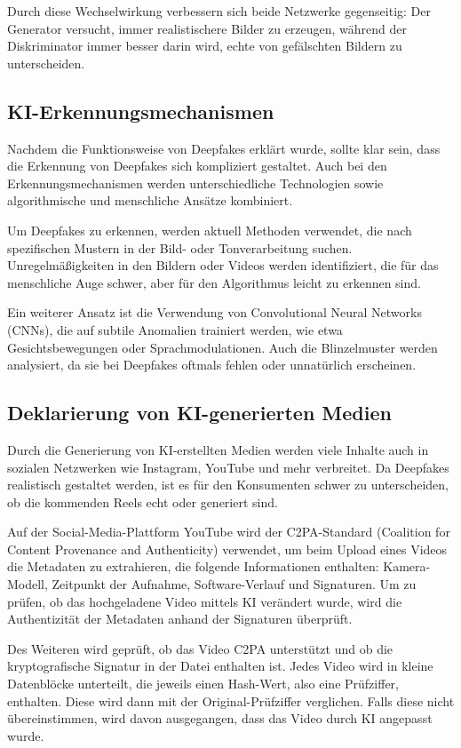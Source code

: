 \documentclass[a4paper,12pt]{article}
\begin{document}
Durch diese Wechselwirkung verbessern sich beide Netzwerke gegenseitig: Der Generator versucht, immer realistischere Bilder zu erzeugen, 
während der Diskriminator immer besser darin wird, echte von gefälschten Bildern zu unterscheiden. \cite{BVDW2024}

\subsection{KI-Erkennungsmechanismen}\label{subsec:KI-Erkennungsmechanismen}
Nachdem die Funktionsweise von Deepfakes erklärt wurde, sollte klar sein, dass die Erkennung von Deepfakes sich kompliziert gestaltet. 
Auch bei den Erkennungsmechanismen werden unterschiedliche Technologien sowie algorithmische und menschliche Ansätze kombiniert.  

Um Deepfakes zu erkennen, werden aktuell Methoden verwendet, die nach spezifischen Mustern in der Bild- oder Tonverarbeitung suchen. 
Unregelmäßigkeiten in den Bildern oder Videos werden identifiziert, die für das menschliche Auge schwer, aber für den Algorithmus leicht zu erkennen sind.  

Ein weiterer Ansatz ist die Verwendung von Convolutional Neural Networks (CNNs), die auf subtile Anomalien trainiert werden, wie etwa Gesichtsbewegungen oder Sprachmodulationen. 
Auch die Blinzelmuster werden analysiert, da sie bei Deepfakes oftmals fehlen oder unnatürlich erscheinen. \cite{BVDW2024}

\subsection{Deklarierung von KI-generierten Medien}
Durch die Generierung von KI-erstellten Medien werden viele Inhalte auch in sozialen Netzwerken wie Instagram, YouTube und mehr verbreitet. 
Da Deepfakes realistisch gestaltet werden, ist es für den Konsumenten schwer zu unterscheiden, ob die kommenden Reels echt oder generiert sind.  

Auf der Social-Media-Plattform YouTube wird der C2PA-Standard (Coalition for Content Provenance and Authenticity) verwendet, 
um beim Upload eines Videos die Metadaten zu extrahieren, die folgende Informationen enthalten: Kamera-Modell, Zeitpunkt der Aufnahme, Software-Verlauf und Signaturen. 
Um zu prüfen, ob das hochgeladene Video mittels KI verändert wurde, wird die Authentizität der Metadaten anhand der Signaturen überprüft.  

Des Weiteren wird geprüft, ob das Video C2PA unterstützt und ob die kryptografische Signatur in der Datei enthalten ist. Jedes Video wird in kleine Datenblöcke unterteilt, die jeweils einen Hash-Wert, also eine Prüfziffer, enthalten. Diese wird dann mit der Original-Prüfziffer verglichen. Falls diese nicht übereinstimmen, wird davon ausgegangen, dass das Video durch KI angepasst wurde. \cite{TheVerge2024a}  
\end{document}
